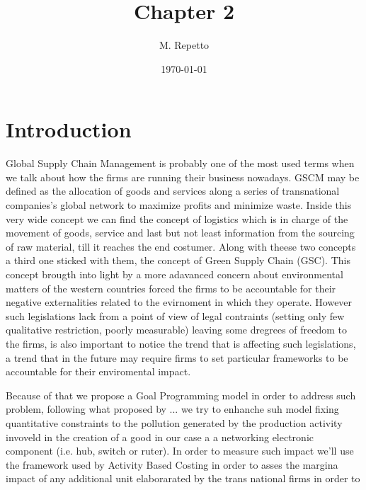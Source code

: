 \documentclass{article}
\begin{document}
\title{Chapter 2}

\author{M. Repetto}

\date{\today}

\maketitle

\begin{abstract}

\end{abstract}

\section{Introduction}
Global Supply Chain Management is probably one of the most used terms when we talk about how the firms are running their business nowadays. GSCM may be defined as the allocation of goods and services along a series of transnational companies's global network to maximize profits and minimize waste. Inside this very wide concept we can find the concept of logistics which is in charge of the movement of goods, service and last but not least information from the sourcing of raw material, till it reaches the end costumer.
Along with theese two concepts a third one sticked with them, the concept of Green Supply Chain (GSC). This concept brougth into light by a more adavanced concern about environmental matters of the western countries forced the firms to be accountable for their negative externalities related to the evirnoment in which they operate. However such legislations lack from a point of view of legal contraints (setting only few qualitative restriction, poorly measurable) leaving some dregrees of freedom to the firms, is also important to notice the trend that is affecting such legislations, a trend that in the future may require firms to set particular frameworks to be accountable for their enviromental impact.

Because of that we propose a Goal Programming model in order to address such problem, following what proposed by ... we try to enhanche suh model fixing quantitative constraints to the pollution generated by the production activity invoveld in the creation of a good in our case a a networking electronic component (i.e. hub, switch or ruter). In order to measure such impact we'll use the framework used by Activity Based Costing in order to asses the margina impact of any additional unit elaborarated by the trans national firms in order to 
\end{document}
